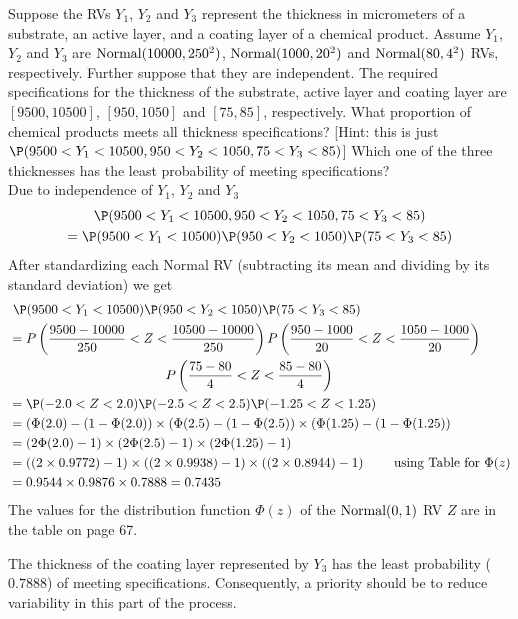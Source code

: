 \begin{ExerciseList}
\Exercise
Suppose the RVs $Y_1$, $Y_2$ and $Y_3$ represent the thickness in micrometers of a substrate, an active layer, and a coating layer of a chemical product.  
Assume $Y_1$, $Y_2$ and $Y_3$ are $\mbox{{\rm Normal}}(10000,250^2)$, $\mbox{{\rm Normal}}(1000,20^2)$ and $\mbox{{\rm Normal}}(80,4^2)$ RVs, respectively.  
Further suppose that they are independent.  
The required specifications for the thickness of the substrate, active layer and coating layer are $[9500,10500]$, $[950,1050]$ and $[75,85]$, respectively.  
What proportion of chemical products meets all thickness specifications? [Hint: this is just $\P(9500<Y_1<10500,950<Y_2<1050,75<Y_3<85)$]  Which one of the three thicknesses has the least probability of meeting specifications?   
\Answer
~\\
Due to independence of $Y_1$, $Y_2$ and $Y_3$
\begin{multline*}
\P(9500<Y_1<10500,950<Y_2<1050,75<Y_3<85)\\ = \P(9500<Y_1<10500) \P(950<Y_2<1050) \P(75<Y_3<85)
\end{multline*}
After standardizing each Normal RV (subtracting its mean and dividing by its standard deviation) we get
\begin{align*}
&~ \P(9500<Y_1<10500) \P(950<Y_2<1050) \P(75<Y_3<85)\\
&=  P\left(\frac{9500-10000}{250}< Z < \frac{10500-10000}{250} \right) P\left( \frac{950-1000}{20}<Z<\frac{1050-1000}{20}\right)\\
&\qquad \qquad \qquad \qquad \qquad \qquad P\left(\frac{75-80}{4}<Z<\frac{85-80}{4}\right)\\
&= \P(-2.0<Z<2.0) \P(-2.5<Z<2.5) \P(-1.25<Z<1.25) \\
&= (\Phi(2.0)-(1-\Phi(2.0)) \times (\Phi(2.5)-(1-\Phi(2.5)) \times (\Phi(1.25)-(1-\Phi(1.25))\\
&= (2\Phi(2.0)-1) \times (2\Phi(2.5)-1) \times (2\Phi(1.25)-1)\\
&= ((2 \times 0.9772) -1) \times ((2 \times 0.9938) - 1) \times ((2 \times 0.8944)-1) \qquad \text{ using Table for $\Phi(z)$} \\
&= 0.9544 \times 0.9876 \times 0.7888 = 0.7435
\end{align*}
The values for the distribution function $\Phi(z)$ of the $\mbox{{\rm Normal}}(0,1)$ RV $Z$ are in the table on page 67. 

The thickness of the coating layer represented by $Y_3$ has the least probability ($0.7888$) of meeting specifications.  Consequently, a priority should be to reduce variability in this part of the process.


\end{ExerciseList}

